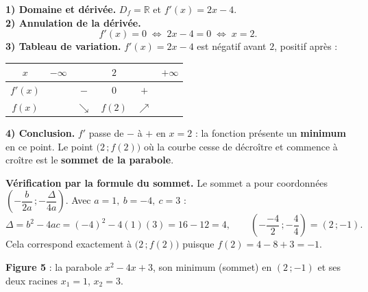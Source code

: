 \documentclass[11pt,a4paper]{article}
\newcommand{\R}{\mathbb{R}}
\newcommand{\Df}{D_f}
\newcommand{\croit}{\textcolor{varcol}{\Large$\nearrow$}}
\newcommand{\decroit}{\textcolor{varcol}{\Large$\searrow$}}
\begin{document}
\begin{exemple}[Étude complète de $f(x)=x^2-4x+3$ (un minimum)]
\textbf{1) Domaine et dérivée.} $\Df=\R$ et $f'(x)=2x-4$.\\[2pt]
\textbf{2) Annulation de la dérivée.}
\[
  f'(x)=0 \;\Longleftrightarrow\; 2x-4=0 \;\Longleftrightarrow\; x=2 .
\]
\textbf{3) Tableau de variation.} $f'(x)=2x-4$ est négatif avant $2$, positif après :

\begin{center}
\renewcommand{\arraystretch}{1.6}\setlength{\tabcolsep}{12pt}
\begin{tabular}{|c|ccccc|}
\hline
\rowcolor{primarylight}
$x$ & $-\infty$ & & $2$ & & $+\infty$ \\
\hline
$f'(x)$ & & $-$ & $0$ & $+$ & \\
\hline
$f(x)$ & & \decroit & $f(2)$ & \croit & \\
\hline
\end{tabular}
\end{center}

\textbf{4) Conclusion.} $f'$ passe de $-$ à $+$ en $x=2$ : la fonction présente un
\textbf{minimum} en ce point. Le point $\big(2\,;f(2)\big)$ où la courbe cesse de
décroître et commence à croître est le \textbf{sommet de la parabole}.

\medskip
\textbf{Vérification par la formule du sommet.} Le sommet a pour coordonnées
$\left(-\dfrac{b}{2a}\,;-\dfrac{\Delta}{4a}\right)$. Avec $a=1,\ b=-4,\ c=3$ :
\[
  \Delta=b^2-4ac=(-4)^2-4(1)(3)=16-12=4,\qquad
  \left(-\frac{-4}{2}\,;-\frac{4}{4}\right)=(2\,;-1).
\]
Cela correspond exactement à $\big(2\,;f(2)\big)$ puisque $f(2)=4-8+3=-1$. \checkmark
\end{exemple}

\begin{center}
\textbf{\textcolor{primary}{Figure 5}} : la parabole $x^2-4x+3$, son minimum (sommet) en
$(2\,;-1)$ et ses deux racines $x_1=1$, $x_2=3$.
\end{center}
\end{document}
